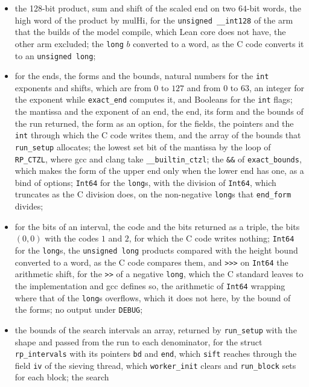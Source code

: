 \begin{itemize}
  \item the 128-bit product, sum and shift of the scaled end on two $64$-bit words, the high word of
    the product by $\mathrm{mulHi}$, for the \verb|unsigned __int128| of the arm that the builds of
    the model compile, which Lean core does not have, the other arm excluded; the \verb|long| $b$
    converted to a word, as the C code converts it to an \verb|unsigned long|;
  \item for the ends, the forms and the bounds, natural numbers for the \verb|int| exponents and
    shifts, which are from $0$ to $127$ and from $0$ to $63$, an integer for the exponent while
    \verb|exact_end| computes it, and Booleans for the \verb|int| flags; the mantissa and the
    exponent of an end, the end, its form and the bounds of the run returned, the form as an option,
    for the fields, the pointers and the \verb|int| through which the C code writes them, and the
    array of the bounds that \verb|run_setup| allocates; the lowest set bit of the mantissa by the
    loop of \verb|RP_CTZL|, where gcc and clang take \verb|__builtin_ctzl|; the \verb|&&| of
    \verb|exact_bounds|, which makes the form of the upper end only when the lower end has one, as a
    bind of options; \verb|Int64| for the \verb|long|s, with the division of \verb|Int64|, which
    truncates as the C division does, on the non-negative \verb|long|s that \verb|end_form| divides;
  \item for the bits of an interval, the code and the bits returned as a triple, the bits $(0, 0)$
    with the codes $1$ and $2$, for which the C code writes nothing; \verb|Int64| for the
    \verb|long|s, the \verb|unsigned long| products compared with the height bound converted to a
    word, as the C code compares them, and \verb|>>>| on \verb|Int64| the arithmetic shift, for the
    \verb|>>| of a negative \verb|long|, which the C standard leaves to the implementation and gcc
    defines so, the arithmetic of \verb|Int64| wrapping where that of the \verb|long|s overflows,
    which it does not here, by the bound of the forms; no output under \verb|DEBUG|;
  \item the bounds of the search intervals an array, returned by \verb|run_setup| with the shape and
    passed from the run to each denominator, for the struct \verb|rp_intervals| with its pointers
    \verb|bd| and \verb|end|, which \verb|sift| reaches through the field \verb|iv| of the sieving
    thread, which \verb|worker_init| clears and \verb|run_block| sets for each block; the search

\end{itemize}
